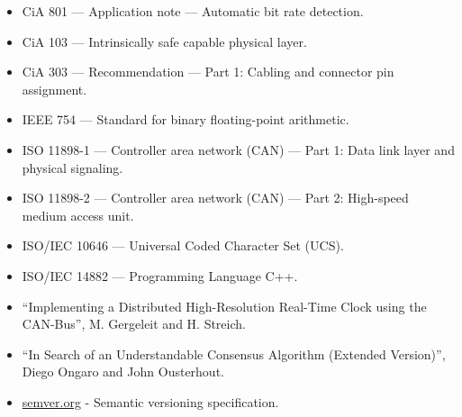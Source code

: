 \begin{itemize}
    \item CiA 801 --- Application note --- Automatic bit rate detection.
    \item CiA 103 --- Intrinsically safe capable physical layer.
    \item CiA 303 --- Recommendation --- Part 1: Cabling and connector pin assignment.
    \item IEEE 754 --- Standard for binary floating-point arithmetic.
    \item ISO 11898-1 --- Controller area network (CAN) --- Part 1: Data link layer and physical signaling.
    \item ISO 11898-2 --- Controller area network (CAN) --- Part 2: High-speed medium access unit.
    \item ISO/IEC 10646 --- Universal Coded Character Set (UCS).
    \item ISO/IEC 14882 --- Programming Language C++.
    \item ``Implementing a Distributed High-Resolution Real-Time Clock using the CAN-Bus'', M. Gergeleit and H. Streich.
    \item ``In Search of an Understandable Consensus Algorithm (Extended Version)'', Diego Ongaro and John Ousterhout.
    \item \href{http://semver.org}{semver.org} - Semantic versioning specification.
\end{itemize}
